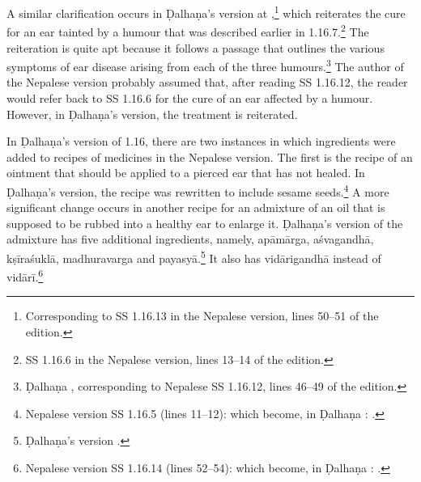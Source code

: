 A similar clarification occurs in Ḍalhaṇa's version at
,\footnote{Corresponding to SS 1.16.13 in the Nepalese version,
    lines 50--51 of the edition.} which reiterates the cure for an ear tainted by a
    humour that was described earlier in 1.16.7.\footnote{SS 1.16.6 in the Nepalese
        version, lines 13--14 of the edition.} The reiteration is quite apt because it
        follows a passage that outlines the various symptoms of ear disease arising from
        each of the three humours.\footnote{Ḍalhaṇa , corresponding to
            Nepalese SS 1.16.12, lines 46--49 of the edition.} The author of the Nepalese
            version probably assumed that, after reading SS 1.16.12, the reader would refer
            back to SS 1.16.6 for the cure of an ear affected by a humour. However, in
            Ḍalhaṇa's version, the treatment is reiterated.

In Ḍalhaṇa's version of 1.16, there are two instances in which ingredients were
added to recipes of medicines in the Nepalese version. The first is the recipe of
an ointment that should be applied to a pierced ear that has not healed. In
Ḍalhaṇa's version,  the recipe was rewritten to include sesame
seeds.\footnote{Nepalese version SS 1.16.5 (lines 11--12):
    which
    become, in Ḍalhaṇa :
    .} 
    A more significant change occurs in another recipe for an admixture of an oil that
    is supposed to be rubbed into a healthy ear to enlarge it. Ḍalhaṇa's version
    of the admixture has five additional ingredients,
    namely, \gls{apāmārga}, \gls{aśvagandhā}, \gls{kṣīraśuklā},
    \gls{madhuravarga}\label{kakolyadi} and \gls{payasyā}.\footnote{Ḍalhaṇa's version 
    .} %
    It also has \gls{vidārigandhā} instead of
    \gls{vidārī}.\footnote{Nepalese version SS 1.16.14 (lines 52--54): 
which
become, in Ḍalhaṇa :
    .}
     
